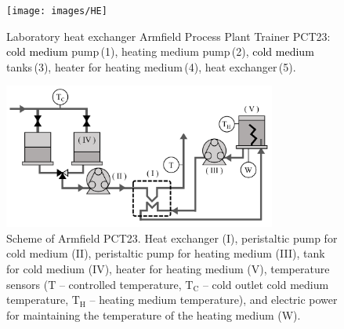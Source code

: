 \documentclass[preprint,12pt]{elsarticle}
\newcommand{\change}[1]{\textcolor{black}{#1}}
\begin{document}
\begin{figure}
	\begin{center}
		\texttt{[image: images/HE]}
		\caption[Heat exchanger Armfield Process Plant Trainer PCT23]{Laboratory heat exchanger Armfield Process Plant Trainer PCT23: \change{cold medium} pump\,(1), heating medium pump\,(2), \change{cold medium} tanks\,(3), heater for heating medium\,(4), heat exchanger\,(5).}
		\label{fig:HE}
	\end{center}
\end{figure}

\begin{figure}
	\begin{center}
		\includegraphics[width=0.8\textwidth]{images/HE_scheme}
		\caption{Scheme of Armfield PCT23. Heat exchanger (I), peristaltic pump for cold medium (II), peristaltic pump for heating medium (III), tank for cold medium (IV), heater for heating medium (V), temperature sensors ($\mathrm{T}$ -- controlled temperature, $\mathrm{T}_\mathrm{C}$ -- cold outlet cold medium temperature, $\mathrm{T}_\mathrm{H}$ -- heating medium temperature), and electric power for maintaining the temperature of the heating medium (W). }
		\label{fig:HE_scheme}
	\end{center}
\end{figure}
\end{document}

